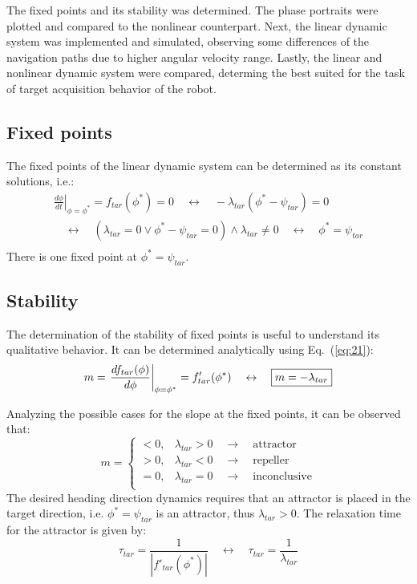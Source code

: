 The fixed points and its stability was determined. The phase portraits
were plotted and compared to the nonlinear counterpart. Next, the linear dynamic
system was implemented and simulated, observing some differences of the
navigation paths due to higher angular velocity range. Lastly, the linear and
nonlinear dynamic system were compared, determing the best suited for the task
of target acquisition behavior of the robot.
%
\subsection{Fixed points}%
\label{sec:fixed-points-linear-phi}
The fixed points of the linear dynamic system can be determined as its constant
solutions, i.e.:
\begin{equation}
  \label{eq:20}
\begin{array}{ll}
  \left. \frac{d \phi}{dt}\right|_{\phi = \phi^*} = f_{tar}(\phi^*) = 0 \quad 
  \leftrightarrow \quad - \lambda_{tar} (\phi^* - \psi_{tar}) = 0\\
      \quad \leftrightarrow \quad 
  (\lambda_{tar} = 0 \vee \phi^* - \psi_{tar} = 0) \wedge \lambda_{tar} \ne 0
  \quad \leftrightarrow \quad \boxed{\phi^* = \psi_{tar}} \\
\end{array} 
\end{equation}
%
There is one fixed point at $\phi^* = \psi_{tar}$.
%
\subsection{Stability}%
\label{sec:stability-linear-phi}
The determination of the stability of fixed points is useful to understand its
qualitative behavior. It can be determined analytically using Eq.~(\ref{eq:21}):
%
\begin{equation}
  \label{eq:21}
  m = \left. \frac{d f_{tar}(\phi)}{d \phi}\right|_{\phi = \phi^*} = f'_{tar}(\phi^*)
  \quad \leftrightarrow \quad  \boxed{m = - \lambda_{tar}}\\
\end{equation}

Analyzing the possible cases for the slope at the fixed points, it can be
observed that:
\begin{equation}
  \label{eq:22}
  m = \left\{
\begin{array}{ll}
      < 0 , & \lambda_{tar} > 0 \quad \rightarrow \quad \mathrm{attractor} \\
      > 0 , & \lambda_{tar} < 0 \quad \rightarrow \quad \mathrm{repeller} \\
      = 0 , & \lambda_{tar} = 0 \quad \rightarrow \quad \mathrm{inconclusive} \\
\end{array} 
\right. 
\end{equation}
The desired heading direction dynamics requires that an attractor is placed in
the target direction, i.e. $\phi^* = \psi_{tar}$ is an attractor, thus
$\lambda_{tar} > 0$. The relaxation time for the attractor is given by:
\begin{equation}
  \label{eq:23}
 \tau_{tar} = \frac{1}{| f'_{tar}(\phi^*) |} \quad \leftrightarrow \quad \boxed{\tau_{tar} = \frac{1}{\lambda_{tar}}}
\end{equation}
%
